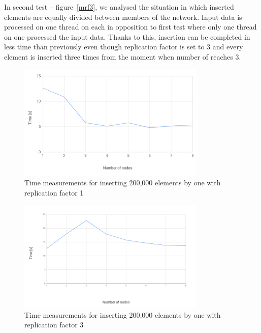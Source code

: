         
        In second test -- figure~\ref{mrf3}, we analysed the situation in which inserted elements are equally divided between members of the network.
        Input data is processed on one thread on each \Node in opposition to first test where only one thread on one \Node processed the input data.
        Thanks to this, insertion can be completed in less time than previously even though replication factor is set to 3 and every element is inserted three times from the moment when number of \Nodes reaches 3.

    \begin{figure}[ht]
        \centering
        \includegraphics[width=0.8\textwidth]{thesis/figures/rf1.png}
        \caption{Time measurements for inserting 200,000 elements by one \Node with replication factor 1}
        \label{rf1}
    \end{figure}
    
    \begin{figure}[ht]
        \centering
        \includegraphics[width=0.8\textwidth]{thesis/figures/rf3.png}
        \caption{Time measurements for inserting 200,000 elements by one \Node with replication factor 3}
        \label{rf3}
    \end{figure}
    
